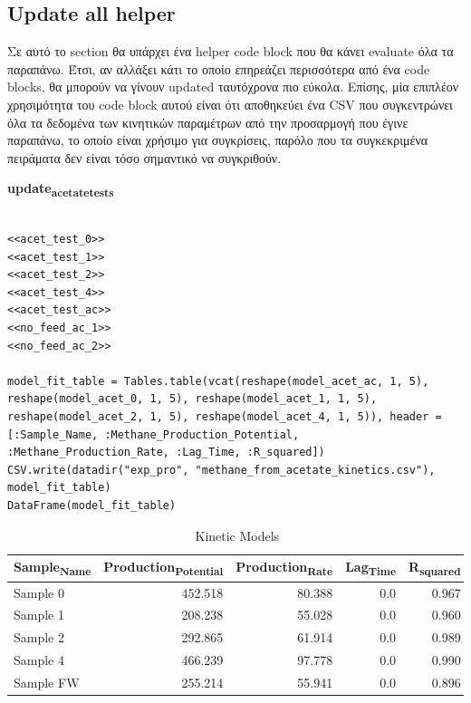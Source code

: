 \documentclass[11pt]{article}
\begin{document}
\subsection{Update all helper}
\label{sec:org79cbcf0}
Σε αυτό το section θα υπάρχει ένα helper code block που θα κάνει evaluate όλα τα παραπάνω. Έτσι, αν αλλάξει κάτι το οποίο επηρεάζει περισσότερα από ένα code blocks, θα μπορούν να γίνουν updated ταυτόχρονα πιο εύκολα. Επίσης, μία επιπλέον χρησιμότητα του code block αυτού είναι ότι αποθηκεύει ένα CSV που συγκεντρώνει όλα τα δεδομένα των κινητικών παραμέτρων από την προσαρμογή που έγινε παραπάνω, το οποίο είναι χρήσιμο για συγκρίσεις, παρόλο που τα συγκεκριμένα πειράματα δεν είναι τόσο σημαντικό να συγκριθούν.

\textbf{update\textsubscript{acetate}\textsubscript{tests}}
\begin{verbatim}

<<acet_test_0>>
<<acet_test_1>>
<<acet_test_2>>
<<acet_test_4>>
<<acet_test_ac>>
<<no_feed_ac_1>>
<<no_feed_ac_2>>

model_fit_table = Tables.table(vcat(reshape(model_acet_ac, 1, 5), reshape(model_acet_0, 1, 5), reshape(model_acet_1, 1, 5), reshape(model_acet_2, 1, 5), reshape(model_acet_4, 1, 5)), header = [:Sample_Name, :Methane_Production_Potential, :Methane_Production_Rate, :Lag_Time, :R_squared])
CSV.write(datadir("exp_pro", "methane_from_acetate_kinetics.csv"), model_fit_table)
DataFrame(model_fit_table)

\end{verbatim}

\begin{table}[htbp]
\caption{Kinetic Models}
\centering
\begin{tabular}{lrrrr}
Sample\textsubscript{Name} & Production\textsubscript{Potential} & Production\textsubscript{Rate} & Lag\textsubscript{Time} & R\textsubscript{squared}\\[0pt]
\hline
Sample 0 & 452.518 & 80.388 & 0.0 & 0.967\\[0pt]
Sample 1 & 208.238 & 55.028 & 0.0 & 0.960\\[0pt]
Sample 2 & 292.865 & 61.914 & 0.0 & 0.989\\[0pt]
Sample 4 & 466.239 & 97.778 & 0.0 & 0.990\\[0pt]
Sample FW & 255.214 & 55.941 & 0.0 & 0.896\\[0pt]
\end{tabular}
\end{table}
\end{document}
